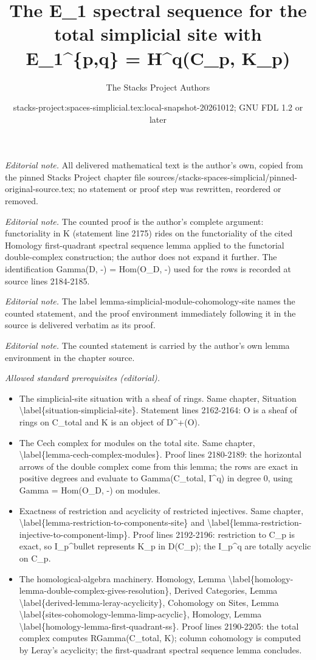 \documentclass{stacks-project}
\title{The E\_1 spectral sequence for the total simplicial site with E\_1\textasciicircum{}\{p,q\} = H\textasciicircum{}q(C\_p, K\_p)}
\author{The Stacks Project Authors}
\date{stacks-project:spaces-simplicial.tex:local-snapshot-20261012; GNU FDL 1.2 or later}
\theoremstyle{plain}
\theoremstyle{definition}
\theoremstyle{remark}
\numberwithin{equation}{subsection}
\begin{document}
\maketitle
\noindent\textit{Editorial note.} All delivered mathematical text is the author's own, copied from the pinned Stacks Project chapter file sources/stacks-spaces-simplicial/pinned-original-source.tex; no statement or proof step was rewritten, reordered or removed.\par\medskip
\noindent\textit{Editorial note.} The counted proof is the author's complete argument: functoriality in K (statement line 2175) rides on the functoriality of the cited Homology first-quadrant spectral sequence lemma applied to the functorial double-complex construction; the author does not expand it further. The identification Gamma(D, -) = Hom(O\_D, -) used for the rows is recorded at source lines 2184-2185.\par\medskip
\noindent\textit{Editorial note.} The label lemma-simplicial-module-cohomology-site names the counted statement, and the proof environment immediately following it in the source is delivered verbatim as its proof.\par\medskip
\noindent\textit{Editorial note.} The counted statement is carried by the author's own lemma environment in the chapter source.\par\medskip
\noindent\textit{Allowed standard prerequisites (editorial).}\begin{itemize}
\item The simplicial-site situation with a sheaf of rings. Same chapter, Situation \textbackslash{}label\{situation-simplicial-site\}. Statement lines 2162-2164: O is a sheaf of rings on C\_total and K is an object of D\textasciicircum{}+(O).
\item The Cech complex for modules on the total site. Same chapter, \textbackslash{}label\{lemma-cech-complex-modules\}. Proof lines 2180-2189: the horizontal arrows of the double complex come from this lemma; the rows are exact in positive degrees and evaluate to Gamma(C\_total, I\textasciicircum{}q) in degree 0, using Gamma = Hom(O\_D, -) on modules.
\item Exactness of restriction and acyclicity of restricted injectives. Same chapter, \textbackslash{}label\{lemma-restriction-to-components-site\} and \textbackslash{}label\{lemma-restriction-injective-to-component-limp\}. Proof lines 2192-2196: restriction to C\_p is exact, so I\_p\textasciicircum{}bullet represents K\_p in D(C\_p); the I\_p\textasciicircum{}q are totally acyclic on C\_p.
\item The homological-algebra machinery. Homology, Lemma \textbackslash{}label\{homology-lemma-double-complex-gives-resolution\}, Derived Categories, Lemma \textbackslash{}label\{derived-lemma-leray-acyclicity\}, Cohomology on Sites, Lemma \textbackslash{}label\{sites-cohomology-lemma-limp-acyclic\}, Homology, Lemma \textbackslash{}label\{homology-lemma-first-quadrant-ss\}. Proof lines 2190-2205: the total complex computes RGamma(C\_total, K); column cohomology is computed by Leray's acyclicity; the first-quadrant spectral sequence lemma concludes.
\end{itemize}\medskip
\end{document}
